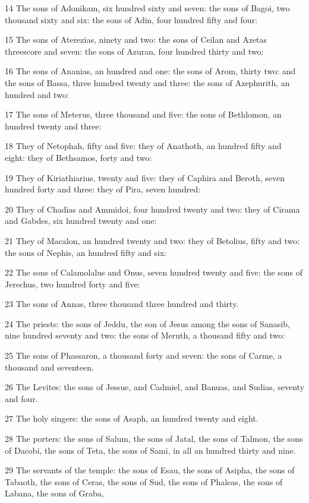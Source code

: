 \par 14 The sons of Adonikam, six hundred sixty and seven: the sons of Bagoi, two thousand sixty and six: the sons of Adin, four hundred fifty and four:
\par 15 The sons of Aterezias, ninety and two: the sons of Ceilan and Azetas threescore and seven: the sons of Azuran, four hundred thirty and two:
\par 16 The sons of Ananias, an hundred and one: the sons of Arom, thirty two: and the sons of Bassa, three hundred twenty and three: the sons of Azephurith, an hundred and two:
\par 17 The sons of Meterus, three thousand and five: the sons of Bethlomon, an hundred twenty and three:
\par 18 They of Netophah, fifty and five: they of Anathoth, an hundred fifty and eight: they of Bethsamos, forty and two:
\par 19 They of Kiriathiarius, twenty and five: they of Caphira and Beroth, seven hundred forty and three: they of Pira, seven hundred:
\par 20 They of Chadias and Ammidoi, four hundred twenty and two: they of Cirama and Gabdes, six hundred twenty and one:
\par 21 They of Macalon, an hundred twenty and two: they of Betolius, fifty and two: the sons of Nephis, an hundred fifty and six:
\par 22 The sons of Calamolalus and Onus, seven hundred twenty and five: the sons of Jerechus, two hundred forty and five:
\par 23 The sons of Annas, three thousand three hundred and thirty.
\par 24 The priests: the sons of Jeddu, the son of Jesus among the sons of Sanasib, nine hundred seventy and two: the sons of Meruth, a thousand fifty and two:
\par 25 The sons of Phassaron, a thousand forty and seven: the sons of Carme, a thousand and seventeen.
\par 26 The Levites: the sons of Jessue, and Cadmiel, and Banuas, and Sudias, seventy and four.
\par 27 The holy singers: the sons of Asaph, an hundred twenty and eight.
\par 28 The porters: the sons of Salum, the sons of Jatal, the sons of Talmon, the sons of Dacobi, the sons of Teta, the sons of Sami, in all an hundred thirty and nine.
\par 29 The servants of the temple: the sons of Esau, the sons of Asipha, the sons of Tabaoth, the sons of Ceras, the sons of Sud, the sons of Phaleas, the sons of Labana, the sons of Graba,
